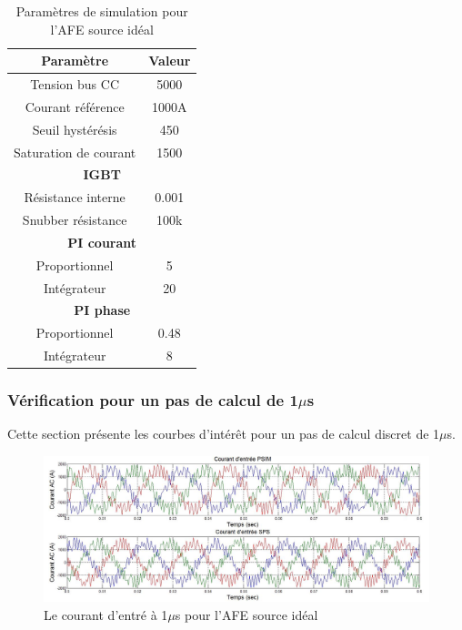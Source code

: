 \documentclass[11pt,letterpaper,final]{report}
\begin{document}
\begin{table}[htb]
\centering
\begin{tabular}{|c|c|} 
  \hline
  \textbf{Paramètre} & \textbf{Valeur}  \\
  \hline\hline
  Tension bus CC & 5000\\ \hline
  Courant référence & 1000A\\ \hline
  Seuil hystérésis & 450\\ \hline
  Saturation de courant& 1500 \\ \hline \hline
  \multicolumn{2}{|c|}{\textbf{IGBT}}\\ \hline
  Résistance interne & 0.001\\
  Snubber résistance & 100k\\ \hline \hline
   \multicolumn{2}{|c|}{\textbf{PI courant}}\\ \hline
  Proportionnel & 5 \\
  Intégrateur & 20 \\ \hline \hline
  \multicolumn{2}{|c|}{\textbf{PI phase}}\\ \hline
  Proportionnel & 0.48 \\
  Intégrateur & 8 \\ \hline \hline
  \hline
\end{tabular}
\caption{Paramètres de simulation pour l'AFE source idéal}
\label{p_AF_ID}
\end{table}

\subsubsection{Vérification pour un pas de calcul de 1$\mu$s}
Cette section présente les courbes d'intérêt pour un pas de calcul discret de 1$\mu$s. 


\begin{figure}[htb]
\centering
\includegraphics[scale=0.5]{Fig/AFEIDEAL/CourantAC.jpg}
\caption{Le courant d'entré à 1$\mu$s pour l'AFE source idéal}
\label{AF_I_cou}
\end{figure}
\end{document}
